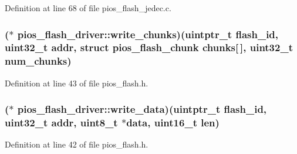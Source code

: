 Definition at line 68 of file pios\-\_\-flash\-\_\-jedec.\-c.

\hypertarget{group___p_i_o_s___f_l_a_s_h_ga5bac463e83aa46ce41c151c74ff8467b}{
\subsubsection[{write\-\_\-chunks}]{($\ast$ pios\-\_\-flash\-\_\-driver\-::write\-\_\-chunks)(uintptr\-\_\-t flash\-\_\-id, {\bf uint32\-\_\-t} {\bf addr}, struct {\bf pios\-\_\-flash\-\_\-chunk} chunks\mbox{[}$\,$\mbox{]}, {\bf uint32\-\_\-t} num\-\_\-chunks)}}\label{group___p_i_o_s___f_l_a_s_h_ga5bac463e83aa46ce41c151c74ff8467b}


Definition at line 43 of file pios\-\_\-flash.\-h.

\hypertarget{group___p_i_o_s___f_l_a_s_h_ga019d8ac125523464c1068f1170852dd0}{
\subsubsection[{write\-\_\-data}]{($\ast$ pios\-\_\-flash\-\_\-driver\-::write\-\_\-data)(uintptr\-\_\-t flash\-\_\-id, {\bf uint32\-\_\-t} {\bf addr}, {\bf uint8\-\_\-t} $\ast${\bf data}, {\bf uint16\-\_\-t} {\bf len})}}\label{group___p_i_o_s___f_l_a_s_h_ga019d8ac125523464c1068f1170852dd0}


Definition at line 42 of file pios\-\_\-flash.\-h.

